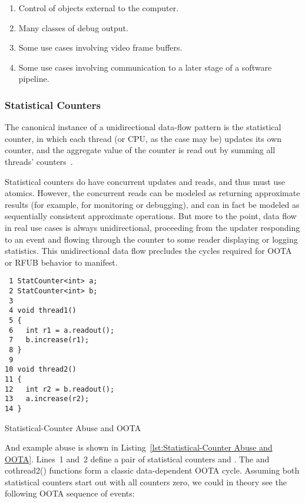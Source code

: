 \documentclass[10]{article}
\begin{document}
\begin{enumerate}
\item	Control of objects external to the computer.
\item	Many classes of debug output.
\item	Some use cases involving video frame buffers.
\item	Some use cases involving communication to a later stage of a
	software pipeline.
\end{enumerate}

\subsubsection{Statistical Counters}
\label{sec:Statistical Counters}

The canonical instance of a unidirectional data-flow pattern is the
statistical counter, in which each thread (or CPU, as the case may be)
updates its own counter, and the aggregate value of the counter is read
out by summing all threads'
counters~\cite[Section 5.2]{McKenney2018ParallelProgramming-2018-12-08a}.

Statistical counters do have concurrent updates and reads, and thus must
use atomics.
However, the concurrent reads can be modeled as returning approximate
results (for example, for monitoring or debugging), and can in fact be
modeled as sequentially consistent approximate operations.
But more to the point, data flow in real use cases is always
unidirectional, proceeding from the updater responding to an event
and flowing through the counter to some reader displaying or logging
statistics.
This unidirectional data flow precludes the cycles required for OOTA or
RFUB behavior to manifest.

\begin{listing}[tbp]
\begin{verbatim}
 1 StatCounter<int> a;
 2 StatCounter<int> b;
 3
 4 void thread1()
 5 {
 6   int r1 = a.readout();
 7   b.increase(r1);
 8 }
 9
10 void thread2()
11 {
12   int r2 = b.readout();
13   a.increase(r2);
14 }
\end{verbatim}
\caption{Statistical-Counter Abuse and OOTA}
\label{lst:Statistical-Counter Abuse and OOTA}
\end{listing}

And example abuse is shown in
Listing~\ref{lst:Statistical-Counter Abuse and OOTA}.
Lines~1 and~2 define a pair of statistical counters  and .
The  and co{thread2()} functions form a classic
data-dependent OOTA cycle.
Assuming both statistical counters start out with all counters zero,
we could in theory see the following OOTA sequence of events:
\end{document}
